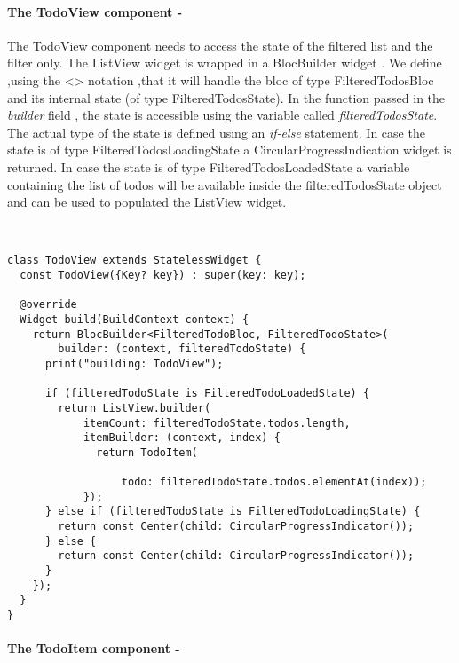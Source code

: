 \paragraph{The TodoView component - }
\label{subpar:todo_app_bloc_core_state}

The TodoView component needs to access the state of the filtered list and the filter only. The ListView widget is wrapped in a BlocBuilder widget . We define ,using the <> notation ,that it will handle the bloc of type FilteredTodosBloc and its internal state (of type FilteredTodosState). In the function passed in the \textit{builder} field , the state is accessible using the variable called \textit{filteredTodosState}. The actual type of the state is defined using an \textit{if-else} statement. In case the state is of type FilteredTodosLoadingState a CircularProgressIndication widget is returned. In case the state is of type FilteredTodosLoadedState a variable containing the list of todos will be available inside the filteredTodosState object and can be used to populated the ListView widget.\begin{code}
\mbox{}\\
 \mbox{}
\label{code:2.14}
\begin{verbatim}
class TodoView extends StatelessWidget {
  const TodoView({Key? key}) : super(key: key);

  @override
  Widget build(BuildContext context) {
    return BlocBuilder<FilteredTodoBloc, FilteredTodoState>(
        builder: (context, filteredTodoState) {
      print("building: TodoView");

      if (filteredTodoState is FilteredTodoLoadedState) {
        return ListView.builder(
            itemCount: filteredTodoState.todos.length,
            itemBuilder: (context, index) {
              return TodoItem(
          
                  todo: filteredTodoState.todos.elementAt(index));
            });
      } else if (filteredTodoState is FilteredTodoLoadingState) {
        return const Center(child: CircularProgressIndicator());
      } else {
        return const Center(child: CircularProgressIndicator());
      }
    });
  }
}
\end{verbatim}
\mbox{}
\end{code}

\paragraph{The TodoItem component - }
\label{subpar:todo_app_bloc_core_state}

